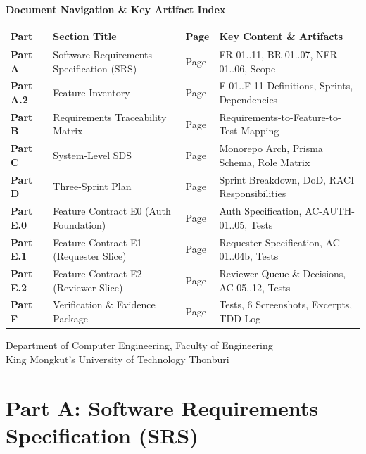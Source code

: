 \documentclass[11pt,a4paper]{article}
\begin{document}
\begin{titlepage}
\vspace{1.0cm}

\textbf{\large Document Navigation \& Key Artifact Index}\\[0.3cm]
\begin{tabularx}{\textwidth}{|>{\RaggedRight}p{1.8cm}|>{\RaggedRight}p{5.5cm}|>{\centering\arraybackslash}p{2.0cm}|>{\RaggedRight}X|}
\toprule
\textbf{Part} & \textbf{Section Title} & \textbf{Page} & \textbf{Key Content \& Artifacts} \\
\midrule
\textbf{Part A} & Software Requirements Specification (SRS) & Page \pageref{sec:part-a} & FR-01..11, BR-01..07, NFR-01..06, Scope \\
\textbf{Part A.2} & Feature Inventory & Page \pageref{sec:part-a-feat} & F-01..F-11 Definitions, Sprints, Dependencies \\
\textbf{Part B} & Requirements Traceability Matrix & Page \pageref{sec:part-b} & Requirements-to-Feature-to-Test Mapping \\
\textbf{Part C} & System-Level SDS & Page \pageref{sec:part-c} & Monorepo Arch, Prisma Schema, Role Matrix \\
\textbf{Part D} & Three-Sprint Plan & Page \pageref{sec:part-d} & Sprint Breakdown, DoD, RACI Responsibilities \\
\textbf{Part E.0} & Feature Contract E0 (Auth Foundation) & Page \pageref{sec:part-e0} & Auth Specification, AC-AUTH-01..05, Tests \\
\textbf{Part E.1} & Feature Contract E1 (Requester Slice) & Page \pageref{sec:part-e1} & Requester Specification, AC-01..04b, Tests \\
\textbf{Part E.2} & Feature Contract E2 (Reviewer Slice) & Page \pageref{sec:part-e2} & Reviewer Queue \& Decisions, AC-05..12, Tests \\
\textbf{Part F} & Verification \& Evidence Package & Page \pageref{sec:part-f} & 34 Tests, 6 Screenshots, Excerpts, TDD Log \\
\bottomrule
\end{tabularx}

\vfill
{\small Department of Computer Engineering, Faculty of Engineering\\King Mongkut's University of Technology Thonburi}
\end{titlepage}

\newpage
{}
\setcounter{page}{1}
\newpage
\section{Part A: Software Requirements Specification (SRS)}\label{sec:part-a}
\end{document}
